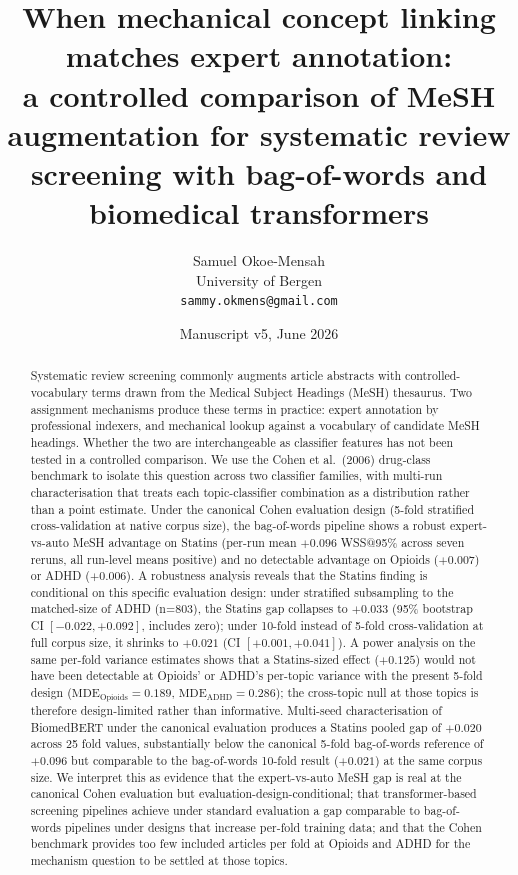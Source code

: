 \documentclass[11pt,a4paper]{article}
\title{\vspace{-2em}When mechanical concept linking matches expert annotation:\\
a controlled comparison of MeSH augmentation for systematic review screening with bag-of-words and biomedical transformers}
\author{Samuel Okoe-Mensah\\
\small University of Bergen\\
\small \texttt{sammy.okmens@gmail.com}}
\date{Manuscript v5, \textbar{} June 2026}
\begin{document}
\maketitle

\vspace{-1em}

\begin{abstract}
\noindent Systematic review screening commonly augments article abstracts with controlled-vocabulary terms drawn from the Medical Subject Headings (MeSH) thesaurus. Two assignment mechanisms produce these terms in practice: expert annotation by professional indexers, and mechanical lookup against a vocabulary of candidate MeSH headings. Whether the two are interchangeable as classifier features has not been tested in a controlled comparison. We use the Cohen et al.\ (2006) drug-class benchmark to isolate this question across two classifier families, with multi-run characterisation that treats each topic-classifier combination as a distribution rather than a point estimate. Under the canonical Cohen evaluation design (5-fold stratified cross-validation at native corpus size), the bag-of-words pipeline shows a robust expert-vs-auto MeSH advantage on Statins (per-run mean $+0.096$ WSS@95\% across seven reruns, all run-level means positive) and no detectable advantage on Opioids ($+0.007$) or ADHD ($+0.006$). A robustness analysis reveals that the Statins finding is conditional on this specific evaluation design: under stratified subsampling to the matched-size of ADHD (n=803), the Statins gap collapses to $+0.033$ (95\% bootstrap CI $[-0.022, +0.092]$, includes zero); under 10-fold instead of 5-fold cross-validation at full corpus size, it shrinks to $+0.021$ (CI $[+0.001, +0.041]$). A power analysis on the same per-fold variance estimates shows that a Statins-sized effect ($+0.125$) would not have been detectable at Opioids' or ADHD's per-topic variance with the present 5-fold design ($\text{MDE}_{\text{Opioids}} = 0.189$, $\text{MDE}_{\text{ADHD}} = 0.286$); the cross-topic null at those topics is therefore design-limited rather than informative. Multi-seed characterisation of BiomedBERT under the canonical evaluation produces a Statins pooled gap of $+0.020$ across 25 fold values, substantially below the canonical 5-fold bag-of-words reference of $+0.096$ but comparable to the bag-of-words 10-fold result ($+0.021$) at the same corpus size. We interpret this as evidence that the expert-vs-auto MeSH gap is real at the canonical Cohen evaluation but evaluation-design-conditional; that transformer-based screening pipelines achieve under standard evaluation a gap comparable to bag-of-words pipelines under designs that increase per-fold training data; and that the Cohen benchmark provides too few included articles per fold at Opioids and ADHD for the mechanism question to be settled at those topics.
\end{abstract}
\end{document}
